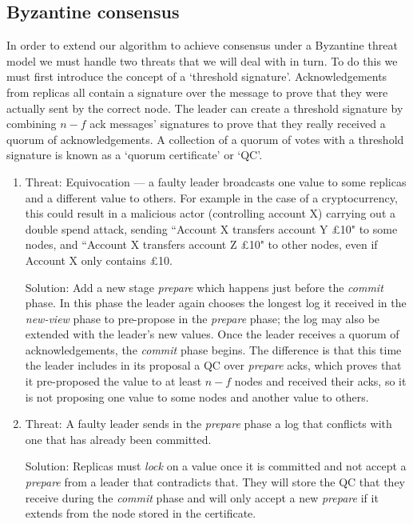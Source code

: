 \subsection{Byzantine consensus}
In order to extend our algorithm to achieve consensus under a Byzantine threat model we must handle two threats that we will deal with in turn. To do this we must first introduce the concept of a `threshold signature'. Acknowledgements from replicas all contain a signature over the message to prove that they were actually sent by the correct node. The leader can create a threshold signature by combining $n - f$ ack messages' signatures to prove that they really received a quorum of acknowledgements. A collection of a quorum of votes with a threshold signature is known as a `quorum certificate' or `QC'.

\begin{enumerate}
\item Threat: Equivocation --- a faulty leader broadcasts one value to some replicas and a different value to others. For example in the case of a cryptocurrency, this could result in a malicious actor (controlling account X) carrying out a double spend attack, sending ``Account X transfers account Y £10" to some nodes, and ``Account X transfers account Z £10" to other nodes, even if Account X only contains £10.

Solution: Add a new stage \textit{prepare} which happens just before the \textit{commit} phase. In this phase the leader again chooses the longest log it received in the \textit{new-view} phase to pre-propose in the \textit{prepare} phase; the log may also be extended with the leader's new values. Once the leader receives a quorum of acknowledgements, the \textit{commit} phase begins. The difference is that this time the leader includes in its proposal a QC over \textit{prepare} acks, which proves that it pre-proposed the value to at least $n - f$ nodes and received their acks, so it is not proposing one value to some nodes and another value to others.

\item Threat: A faulty leader sends in the \textit{prepare} phase a log that conflicts with one that has already been committed.

Solution: Replicas must \textit{lock} on a value once it is committed and not accept a \textit{prepare} from a leader that contradicts that. They will store the QC that they receive during the \textit{commit} phase and will only accept a new \textit{prepare} if it extends from the node stored in the certificate.
\end{enumerate}

